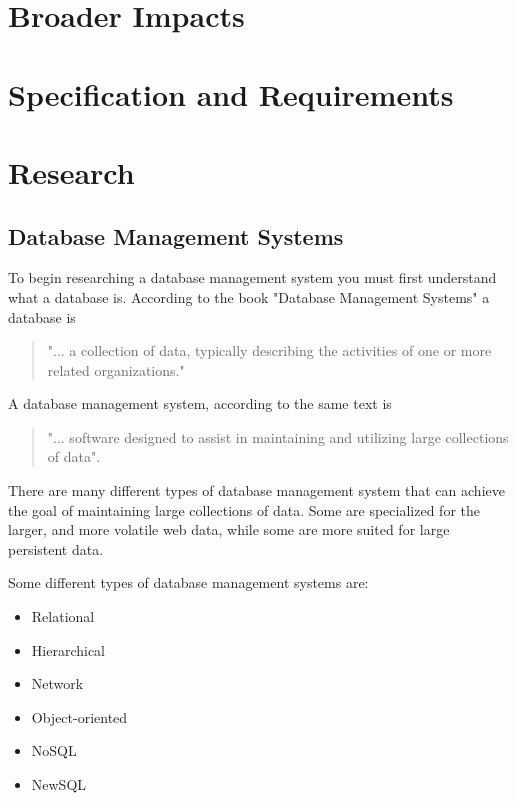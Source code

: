 \documentclass[letterpaper, 12pt]{article}
\begin{document}
\section{Broader Impacts}
\newpage

\section{Specification and Requirements}
\newpage

\section{Research}

\subsection{Database Management Systems}
To begin researching a database management system you must first understand what a 
database is. According to the book "Database Management Systems" a database is

\begin{quote}
"... a collection of data, typically describing the activities of one or more related
organizations."\cite{ramakrishnan2000database}
\end{quote}

A database management system, according to the same text is

\begin{quote}
"... software designed to assist in maintaining and utilizing large collections of data".
\cite{ramakrishnan2000database}
\end{quote}

There are many different types of database management system that can achieve the
goal of maintaining large collections of data. Some are specialized for the larger, and 
more volatile web data, while some are more suited for large persistent data.  
\par\vspace{\baselineskip}
Some different types of database management systems are:
\begin{itemize}
\item Relational
\item Hierarchical
\item Network
\item Object-oriented
\item NoSQL
\item NewSQL
\end{itemize}
\end{document}
